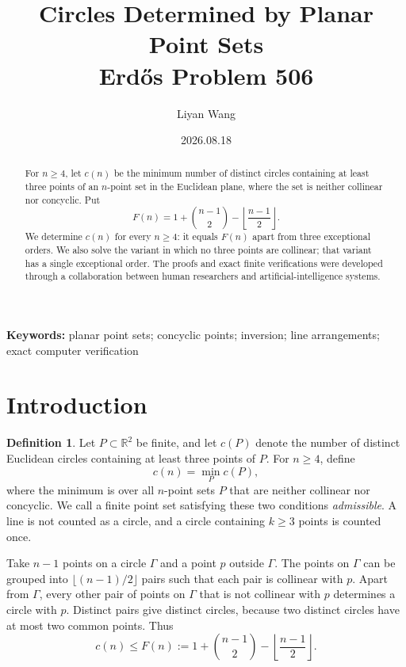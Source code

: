 \documentclass[11pt,a4paper]{article}
\title{Circles Determined by Planar Point Sets\\
\large Erd\H{o}s Problem 506}
\author{Liyan Wang}
\date{2026.08.18}
\theoremstyle{definition}
\newtheorem{definition}[theorem]{Definition}
\begin{document}
\maketitle

\begin{abstract}
For $n\ge4$, let $c(n)$ be the minimum number of distinct circles containing at least
three points of an $n$-point set in the Euclidean plane, where the set is neither
collinear nor concyclic.  Put
\[
F(n)=1+\binom{n-1}{2}-\left\lfloor\frac{n-1}{2}\right\rfloor.
\]
We determine $c(n)$ for every $n\ge4$: it equals $F(n)$ apart from three
exceptional orders.  We also solve the variant in which no three points are
collinear; that variant has a single exceptional order.  The proofs and exact
finite verifications were developed through a collaboration between human
researchers and artificial-intelligence systems.
\end{abstract}

\noindent\textbf{Keywords:} planar point sets; concyclic points; inversion; line
arrangements; exact computer verification

\begingroup
\setcounter{tocdepth}{1}
\small
\tableofcontents
\endgroup
\clearpage

\section{Introduction}

\begin{definition}
Let $P\subset\mathbb R^2$ be finite, and let $c(P)$ denote the number of distinct
Euclidean circles containing at least three points of $P$.  For $n\ge4$, define
\[
c(n)=\min_P c(P),
\]
where the minimum is over all $n$-point sets $P$ that are neither collinear nor
concyclic.  We call a finite point set satisfying these two conditions
\emph{admissible}.  A line is not counted as a circle, and a circle containing
$k\ge3$ points is counted once.
\end{definition}

Take $n-1$ points on a circle $\Gamma$ and a point $p$ outside $\Gamma$.  The points
on $\Gamma$ can be grouped into $\lfloor(n-1)/2\rfloor$ pairs such that each pair is
collinear with $p$.  Apart from $\Gamma$, every other pair of points on $\Gamma$
that is not collinear with $p$ determines a circle with $p$.  Distinct pairs give
distinct circles, because two distinct circles have at most two common points.
Thus
\begin{equation}\label{eq:F-en}
c(n)\le F(n):=1+\binom{n-1}{2}-\left\lfloor\frac{n-1}{2}\right\rfloor.
\end{equation}
\end{document}

